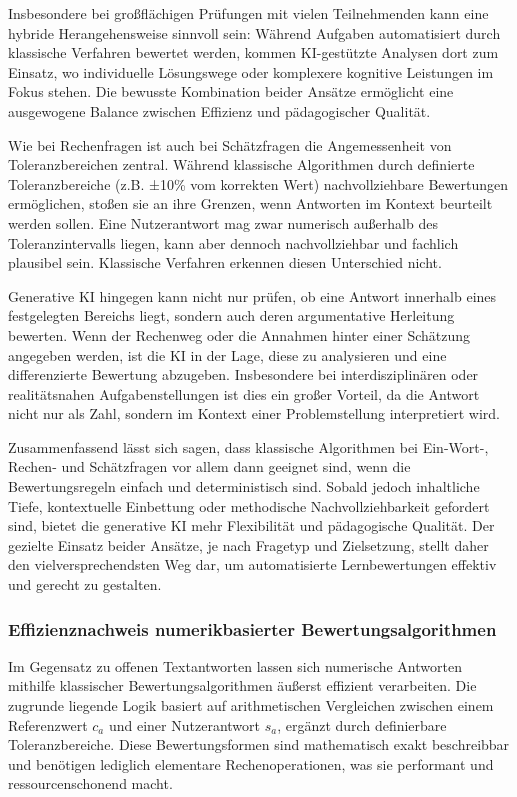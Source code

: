 \documentclass[a4paper,12pt]{article}
\begin{document}
Insbesondere bei großflächigen Prüfungen mit vielen Teilnehmenden kann eine hybride Herangehensweise sinnvoll sein: Während Aufgaben automatisiert durch klassische Verfahren bewertet werden, kommen KI-gestützte Analysen dort zum Einsatz, wo individuelle Lösungswege oder komplexere kognitive Leistungen im Fokus stehen. Die bewusste Kombination beider Ansätze ermöglicht eine ausgewogene Balance zwischen Effizienz und pädagogischer Qualität.

Wie bei Rechenfragen ist auch bei Schätzfragen die Angemessenheit von Toleranzbereichen zentral. Während klassische Algorithmen durch definierte Toleranzbereiche (z.B. ±10\% vom korrekten Wert) nachvollziehbare Bewertungen ermöglichen, stoßen sie an ihre Grenzen, wenn Antworten im Kontext beurteilt werden sollen. Eine Nutzerantwort mag zwar numerisch außerhalb des Toleranzintervalls liegen, kann aber dennoch nachvollziehbar und fachlich plausibel sein. Klassische Verfahren erkennen diesen Unterschied nicht.

Generative KI hingegen kann nicht nur prüfen, ob eine Antwort innerhalb eines festgelegten Bereichs liegt, sondern auch deren argumentative Herleitung bewerten. Wenn der Rechenweg oder die Annahmen hinter einer Schätzung angegeben werden, ist die KI in der Lage, diese zu analysieren und eine differenzierte Bewertung abzugeben. Insbesondere bei interdisziplinären oder realitätsnahen Aufgabenstellungen ist dies ein großer Vorteil, da die Antwort nicht nur als Zahl, sondern im Kontext einer Problemstellung interpretiert wird.

Zusammenfassend lässt sich sagen, dass klassische Algorithmen bei Ein-Wort-, Rechen- und Schätzfragen vor allem dann geeignet sind, wenn die Bewertungsregeln einfach und deterministisch sind. Sobald jedoch inhaltliche Tiefe, kontextuelle Einbettung oder methodische Nachvollziehbarkeit gefordert sind, bietet die generative KI mehr Flexibilität und pädagogische Qualität. Der gezielte Einsatz beider Ansätze, je nach Fragetyp und Zielsetzung, stellt daher den vielversprechendsten Weg dar, um automatisierte Lernbewertungen effektiv und gerecht zu gestalten.

\subsubsection{Effizienznachweis numerikbasierter Bewertungsalgorithmen}

Im Gegensatz zu offenen Textantworten lassen sich numerische Antworten mithilfe klassischer Bewertungsalgorithmen äußerst effizient verarbeiten. Die zugrunde liegende Logik basiert auf arithmetischen Vergleichen zwischen einem Referenzwert \( c_a \) und einer Nutzerantwort \( s_a \), ergänzt durch definierbare Toleranzbereiche. Diese Bewertungsformen sind mathematisch exakt beschreibbar und benötigen lediglich elementare Rechenoperationen, was sie performant und ressourcenschonend macht.
\end{document}
